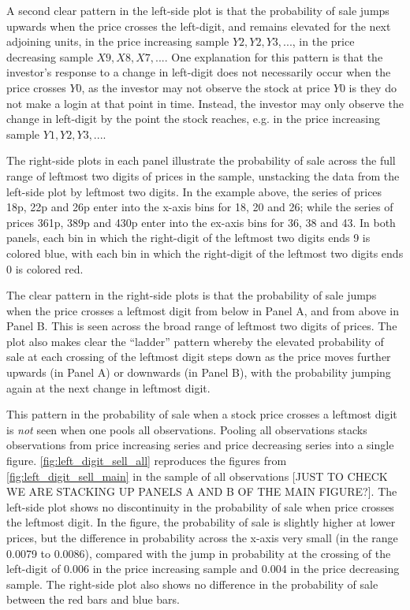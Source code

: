 A second clear pattern in the left-side plot is that the probability of sale jumps upwards when the price crosses the left-digit, and remains elevated for the next adjoining units, in the price increasing sample $Y2, Y2, Y3, ...$, in the price decreasing sample $X9, X8, X7,...$. One explanation for this pattern is that the investor's response to a change in left-digit does not necessarily occur when the price crosses $Y0$, as the investor may not observe the stock at price $Y0$ is they do not make a login at that point in time. Instead, the investor may only observe the change in left-digit by the point the stock reaches, e.g. in the price increasing sample $Y1, Y2, Y3,...$.

The right-side plots in each panel illustrate the probability of sale across the full range of leftmost two digits of prices in the sample, unstacking the data from the left-side plot by leftmost two digits. In the example above, the series of prices 18p, 22p and 26p enter into the x-axis bins for 18, 20 and 26; while the series of prices 361p, 389p and 430p enter into the ex-axis bins for 36, 38 and 43. In both panels, each bin in which the right-digit of the leftmost two digits ends 9 is colored blue, with each bin in which the right-digit of the leftmost two digits ends 0 is colored red.

The clear pattern in the right-side plots is that the probability of sale jumps when the price crosses a leftmost digit from below in Panel A, and from above in Panel B. This is seen across the broad range of leftmost two digits of prices. The plot also makes clear the ``ladder'' pattern whereby the elevated probability of sale at each crossing of the leftmost digit steps down as the price moves further upwards (in Panel A) or downwards (in Panel B), with the probability jumping again at the next change in leftmost digit.

This pattern in the probability of sale when a stock price crosses a leftmost digit is \textit{not} seen when one pools all observations. Pooling all observations stacks observations from price increasing series and price decreasing series into a single figure. \ref{fig:left_digit_sell_all} reproduces the figures from \ref{fig:left_digit_sell_main} in the sample of all observations [JUST TO CHECK WE ARE STACKING UP PANELS A AND B OF THE MAIN FIGURE?]. The left-side plot shows no discontinuity in the probability of sale when price crosses the leftmost digit. In the figure, the probability of sale is slightly higher at lower prices, but the difference in probability across the x-axis very small (in the range 0.0079 to 0.0086), compared with the jump in probability at the crossing of the left-digit of 0.006 in the price increasing sample and 0.004 in the price decreasing sample. The right-side plot also shows no difference in the probability of sale between the red bars and blue bars.

